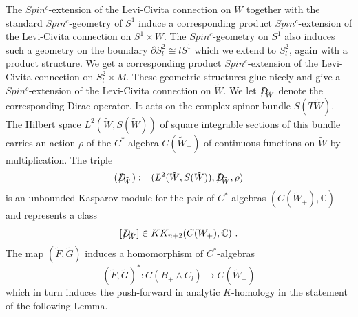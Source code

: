 \documentclass[12pt]{article}
\newcommand{\C}{{\mathbb{C}}}
\newcommand{\Dirac}{{D\hspace{-0.27cm}/}}
\begin{document}
The $Spin^{c}$-extension of the Levi-Civita connection on $W$ together with the standard $Spin^{c}$-geometry of $S^{1}$ induce a corresponding  product $Spin^{c}$-extension of the Levi-Civita connection on $S^{1}\times W$. The  $Spin^{c}$-geometry on $S^{1}$  also induces such a geometry on the boundary  $\partial S^{2}_{l}\cong lS^{1}$ which we extend to $S^{2}_{l}$, again with a product structure.
We get a corresponding product   $Spin^{c}$-extension of the Levi-Civita connection on $S^{2}_{l}\times M$. These geometric structures glue nicely and give a   $Spin^{c}$-extension of the Levi-Civita connection on  $\tilde W$. We let $\Dirac_{\tilde W}$ denote the corresponding Dirac operator. It acts on the complex spinor bundle $S(T\tilde W)$.
The Hilbert space $L^{2}(\tilde W,S(\tilde W))$ of square integrable sections of this bundle carries an action $\rho$ of the $C^{*}$-algebra
$C(\tilde W_{+})$ of continuous functions on $\tilde W$ by multiplication. The triple
$$(\Dirac_{\tilde W}):=(L^{2}(\tilde W,S(\tilde W)), \Dirac_{\tilde W},\rho)$$ is an unbounded Kasparov module for the pair of $C^{*}$-algebras $(C(\tilde W_{+}),\C)$ and represents a class
$$[\Dirac_{\tilde W}]\in KK_{n+2}(C(\tilde W_{+}),\C)\ .$$
The map $(\tilde F,\tilde G)$ induces a homomorphism of $C^{*}$-algebras
$$(\tilde F,\tilde G)^{*}:C(B_{+}\wedge C_{l})\to C(\tilde W_{+})$$ which in turn induces the push-forward in analytic $K$-homology in the statement of the following Lemma.
\end{document}
